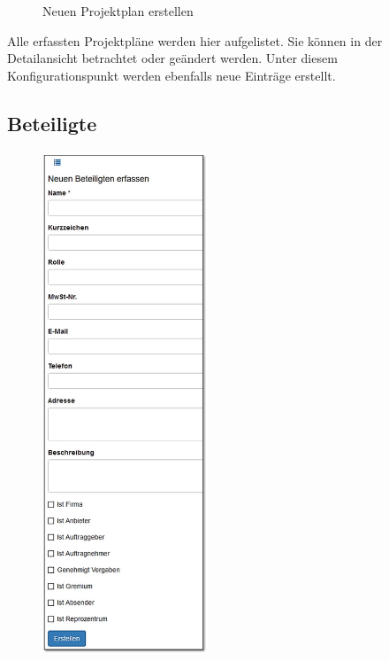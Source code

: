 \begin{figure}[H]
\caption{Neuen Projektplan erstellen}
\end{figure}

Alle erfassten Projektpläne werden hier aufgelistet. Sie können in der Detailansicht betrachtet oder geändert werden. Unter diesem Konfigurationspunkt werden ebenfalls neue Einträge erstellt.

\pagebreak
\subsection{Beteiligte}
\label{bkm:Ref2018071602}

\begin{figure}
\vspace{-45pt}
\includegraphics[height=150mm]{../chapters/13_Konfigurationen/pictures/konf_BeteiligteErfassen.jpg}
\end{figure}

